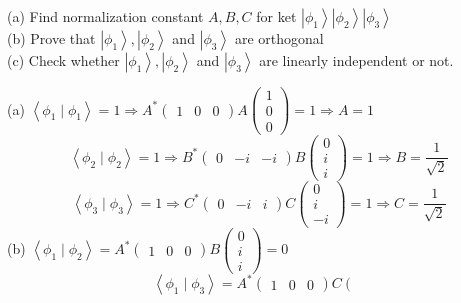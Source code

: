 \begin{enumerate}
\begin{minipage}{\textwidth}
	(a) Find normalization constant $A, B, C$ for ket $\left|\phi_{1}\right\rangle\left|\phi_{2}\right\rangle\left|\phi_{3}\right\rangle$\\
	(b) Prove that $\left|\phi_{1}\right\rangle,\left|\phi_{2}\right\rangle$ and $\left|\phi_{3}\right\rangle$ are orthogonal\\
	(c) Check whether $\left|\phi_{1}\right\rangle,\left|\phi_{2}\right\rangle$ and $\left|\phi_{3}\right\rangle$ are linearly independent or not.
\end{minipage}
\begin{answer}
	(a) $\left\langle\phi_{1} \mid \phi_{1}\right\rangle=1 \Rightarrow A^{*}\left(\begin{array}{lll}1 & 0 & 0\end{array}\right) A\left(\begin{array}{l}1 \\ 0 \\ 0\end{array}\right)=1 \Rightarrow A=1$
	$$
	\left\langle\phi_{2} \mid \phi_{2}\right\rangle=1 \Rightarrow B^{*}\left(\begin{array}{lll}
	0 & -i & -i
	\end{array}\right) B\left(\begin{array}{l}
	0 \\
	i \\
	i
	\end{array}\right)=1 \Rightarrow B=\frac{1}{\sqrt{2}}
	$$
	$$
	\left\langle\phi_{3} \mid \phi_{3}\right\rangle=1 \Rightarrow C^{*}\left(\begin{array}{lll}
	0 & -i & i
	\end{array}\right) C\left(\begin{array}{c}
	0 \\
	i \\
	-i
	\end{array}\right)=1 \Rightarrow C=\frac{1}{\sqrt{2}}
	$$
	(b) $\left\langle\phi_{1} \mid \phi_{2}\right\rangle=A^{*}\left(\begin{array}{lll}1 & 0 & 0\end{array}\right) B\left(\begin{array}{l}0 \\ i \\ i\end{array}\right)=0$
	$$
	\left\langle\phi_{1} \mid \phi_{3}\right\rangle=A^{*}\left(\begin{array}{lll}
	1 & 0 & 0
	\end{array}\right) C\left(\begin{array}{c}

\end{array}$$
\end{answer}
\end{enumerate}
